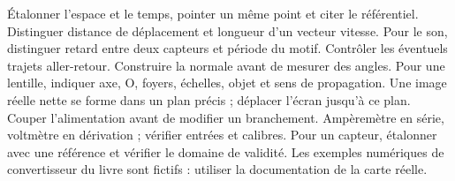 Étalonner l'espace et le temps, pointer un même point et citer le référentiel. Distinguer distance de déplacement et longueur d'un vecteur vitesse. Pour le son, distinguer retard entre deux capteurs et période du motif. Contrôler les éventuels trajets aller-retour.
Construire la normale avant de mesurer des angles. Pour une lentille, indiquer axe, O, foyers, échelles, objet et sens de propagation. Une image réelle nette se forme dans un plan précis ; déplacer l'écran jusqu'à ce plan.
Couper l'alimentation avant de modifier un branchement. Ampèremètre en série, voltmètre en dérivation ; vérifier entrées et calibres. Pour un capteur, étalonner avec une référence et vérifier le domaine de validité. Les exemples numériques de convertisseur du livre sont fictifs : utiliser la documentation de la carte réelle.



